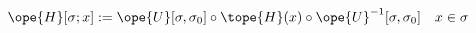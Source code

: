 \begin{equation}	\label{12.80new3}
\ope{H}[\sigma;x]
:= \ope{U}[\sigma,\sigma_0] \circ \tope{H}(x) \circ
   	    \ope{U}^{-1}[\sigma,\sigma_0]
\quad
x\in\sigma
	\end{equation}

